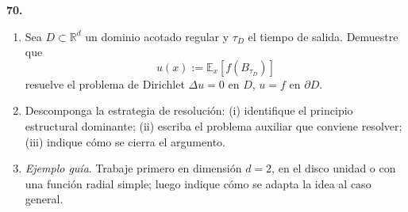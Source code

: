 \documentclass[11pt, letterpaper]{article}
\begin{document}
\begin{ejercicio}
    \textbf{70.} 
    \begin{enumerate}
        \item Sea $D \subset \mathbb{R}^d$ un dominio acotado regular y $\tau_D$ el tiempo de salida. Demuestre que
        \[ u(x) := \mathbb{E}_x[f(B_{\tau_D})] \]
        resuelve el problema de Dirichlet $\Delta u = 0$ en $D$, $u=f$ en $\partial D$.
        \item Descomponga la estrategia de resolución: (i) identifique el principio estructural dominante; (ii) escriba el problema auxiliar que conviene resolver; (iii) indique cómo se cierra el argumento.
        \item \textit{Ejemplo guía}. Trabaje primero en dimensión $d=2$, en el disco unidad o con una función radial simple; luego indique cómo se adapta la idea al caso general.
    \end{enumerate}
\end{ejercicio}

\vspace{5mm}
\end{document}

